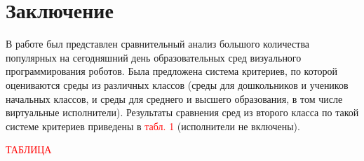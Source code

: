 \documentclass[a5paper]{article}
\begin{document}
\section*{Заключение}
В работе был представлен сравнительный анализ большого количества популярных на сегодняшний день образовательных 
сред визуального программирования роботов. Была предложена система критериев, по которой оцениваются среды из 
различных классов (среды для дошкольников и учеников начальных классов, и среды для среднего и высшего образования, 
в том числе виртуальные исполнители). Результаты сравнения сред из второго класса по такой системе 
критериев приведены в \textcolor{red}{табл. 1} (исполнители не включены).

\textcolor{red}{ТАБЛИЦА}



\end{document}
